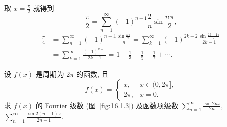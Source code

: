\begin{solution}
\begin{figure}[htbp]
\caption{}\label{fig:16.1.2}
\end{figure}

取 $x=\displaystyle\frac{\pi}{2}$ 就得到
\[
  \frac{\pi}{2}=\sum_{n=1}^{\infty}(-1)^{n-1}\frac{2}{n}\sin\frac{n\pi}{2},
\]
\[
  \begin{aligned}
    \frac{\pi}{4}&=\sum_{n=1}^{\infty}(-1)^{n-1}\frac{\sin\frac{n\pi}{2}}{n}=\sum_{k=1}^{\infty}(-1)^{2k-2}\frac{\sin\frac{2k-1\pi}{2}}{2k-1}\\
    &=\sum_{k=1}^{\infty}\frac{(-1)^{k-1}}{2k-1}=1-\frac{1}{3}+\frac{1}{5}-\frac{1}{7}+\cdots.
  \end{aligned}
\]
\end{solution}

\begin{example}\label{ex:16.1.2}
设 $f(x)$ 是周期为 $2\pi$ 的函数, 且
\[
  f(x)=\begin{cases}
    x, & x\in(0,2\pi],\\
    2\pi, & x=0.
\end{cases}
\]
求 $f(x)$ 的 Fourier 级数 (图~\ref{fig:16.1.3}) 及函数项级数 $\displaystyle\sum_{n=1}^{\infty}\frac{\sin 2nx}{2n}$, $\displaystyle\sum_{n=1}^{\infty}\frac{\sin 2(n-1)x}{2n-1}$.
\end{example}

